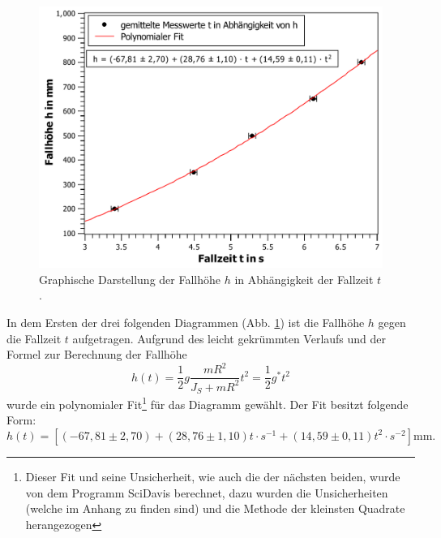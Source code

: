 \begin{figure}[ht]
	\centering
	\includegraphics[width=\textwidth]{auswertung/h-gegen-t.pdf}
	\caption{Graphische Darstellung der Fallhöhe $h$ in Abhängigkeit der Fallzeit $t$.}
	\label{fig:hgegent}	
\end{figure}
In dem Ersten der drei folgenden Diagrammen (Abb. \ref{fig:hgegent}) ist die Fallhöhe $h$ gegen die Fallzeit $t$ aufgetragen.
Aufgrund des leicht gekrümmten Verlaufs und der Formel zur Berechnung der Fallhöhe
\begin{equation}
h(t) = \frac{1}{2}g \frac{mR^2}{J_S + mR^2} t^2 = \frac{1}{2}g^{*}t^2 \label{eq:Fallbeschleunigung}
\end{equation}
wurde ein polynomialer Fit\footnote{Dieser Fit und seine Unsicherheit, wie auch die der nächsten beiden, wurde von dem Programm SciDavis berechnet, dazu wurden die Unsicherheiten (welche im Anhang zu finden sind) und die Methode der kleinsten Quadrate herangezogen} für das Diagramm gewählt.
Der Fit besitzt folgende Form: 
\begin{equation*}
h(t) = [(-67,81\pm 2,70)+(28,76\pm 1,10)t\cdot\si{s^{-1}}+(14,59\pm 0,11)t^2\cdot\si{s^{-2}}]\si{\mm}.
\end{equation*} 
